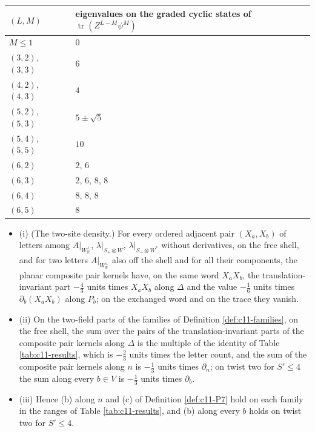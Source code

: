 \begin{tabular}{l|l}
$(L,M)$ & eigenvalues on the graded cyclic states of $\operatorname{tr}(Z^{L-M}\psi^M)$\\
\hline
$M\le1$ & $0$\\
$(3,2)$, $(3,3)$ & $6$\\
$(4,2)$, $(4,3)$ & $4$\\
$(5,2)$, $(5,3)$ & $5\pm\sqrt5$\\
$(5,4)$, $(5,5)$ & $10$\\
$(6,2)$ & $2$, $6$\\
$(6,3)$ & $2$, $6$, $8$, $8$\\
$(6,4)$ & $8$, $8$, $8$\\
$(6,5)$ & $8$\\
\end{tabular}

\begin{theorem}
\label{thm:c11-families}
\begin{itemize}
\item (i) (The two-site density.) For every ordered adjacent pair $(X_a,X_b)$ of letters among $A|_{W_{\mathbb R}^\perp}$, $\lambda|_{S_+\otimes W}$, $\lambda|_{S_-\otimes W^*}$ without derivatives, on the free shell, and for two letters $A|_{W_{\mathbb R}^\perp}$ also off the shell and for all their components, the planar composite pair kernels have, on the same word $X_aX_b$, the translation-invariant part $-\tfrac43$ units times $X_aX_b$ along $\Delta$ and the value $-\tfrac16$ units times $\partial_b(X_aX_b)$ along $P_b$; on the exchanged word and on the trace they vanish.
\item (ii) On the two-field parts of the families of Definition \ref{def:c11-families}, on the free shell, the sum over the pairs of the translation-invariant parts of the composite pair kernels along $\Delta$ is the multiple of the identity of Table \ref{tab:c11-results}, which is $-\tfrac23$ units times the letter count, and the sum of the composite pair kernels along $n$ is $-\tfrac13$ units times $\partial_n$; on twist two for $S'\le4$ the sum along every $b\in V$ is $-\tfrac13$ units times $\partial_b$.
\item (iii) Hence (b) along $n$ and (c) of Definition \ref{def:c11-P7} hold on each family in the ranges of Table \ref{tab:c11-results}, and (b) along every $b$ holds on twist two for $S'\le4$.
\end{itemize}
\end{theorem}

